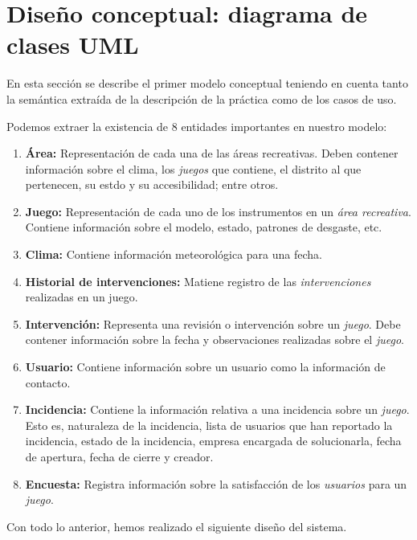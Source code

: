 \documentclass[]{article}
\begin{document}
\section{Diseño conceptual: diagrama de clases UML}
\label{sec:disenno}
En esta sección se describe el primer modelo conceptual teniendo en cuenta tanto la semántica extraída de la descripción de la práctica como de los casos de uso.

Podemos extraer la existencia de 8 entidades importantes en nuestro modelo:
\begin{enumerate}
    \item \textbf{Área:} Representación de cada una de las áreas recreativas. Deben contener información sobre el clima, los \textit{juegos} que contiene, el distrito al que pertenecen, su estdo y su accesibilidad; entre otros.
    \item \textbf{Juego:} Representación de cada uno de los instrumentos en un \textit{área recreativa}. Contiene información sobre el modelo, estado, patrones de desgaste, etc.
    \item \textbf{Clima:} Contiene información meteorológica para una fecha.
    \item \textbf{Historial de intervenciones:} Matiene registro de las \textit{intervenciones} realizadas en un juego.
    \item \textbf{Intervención:} Representa una revisión o intervención sobre un \textit{juego}. Debe contener información sobre la fecha y observaciones realizadas sobre el \textit{juego}.
    \item \textbf{Usuario:} Contiene información sobre un usuario como la información de contacto.
    \item \textbf{Incidencia:} Contiene la información relativa a una incidencia sobre un \textit{juego}. Esto es, naturaleza de la incidencia, lista de usuarios que han reportado la incidencia, estado de la incidencia, empresa encargada de solucionarla, fecha de apertura, fecha de cierre y creador.
    \item \textbf{Encuesta:} Registra información sobre la satisfacción de los \textit{usuarios} para un \textit{juego}.
\end{enumerate}
Con todo lo anterior, hemos realizado el siguiente diseño del sistema.
\end{document}
